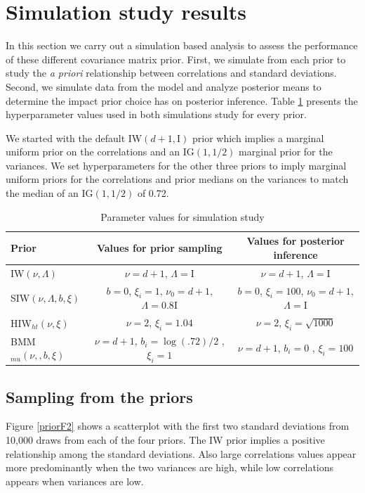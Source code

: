 \documentclass[12pt]{article}
\newcommand{\I}{\mathrm{I}}
\begin{document}
\section{Simulation study results \label{sec:results}}

In this section we carry out a simulation based analysis to assess the performance of these different covariance matrix prior. First, we simulate from each prior to study the \emph{a priori} relationship between correlations and standard deviations. Second, we simulate data from the model and analyze posterior means to determine the impact prior choice has on posterior inference. Table \ref{paramvals} presents the hyperparameter values used in both simulations study for every prior. 

We started with the default IW$(d+1,\I)$ prior which implies a marginal uniform prior on the correlations and an IG$(1,1/2)$ marginal prior for the variances. We set hyperparameters for the other three priors to imply marginal uniform priors for the correlations and prior medians on the variances to match the median of an IG$(1,1/2)$ of 0.72.    

\begin{table}[htbp]
   \centering
    \caption{ Parameter values for simulation study}
   \label{paramvals} 
   \begin{tabular}{ l|c|c}
   \hline
      Prior    &  Values for prior sampling & Values for posterior inference\\ \hline
  IW$(\nu, \Lambda)$ &   $\nu=d+1$, $\Lambda=\I$  & $\nu=d+1$, $\Lambda=\I$  \\ 
  SIW$(\nu, \Lambda, b, \xi)$  & $b=0$, $\xi_i =1$,  $\nu_0= d + 1$, $\Lambda = 0.8\I$ & $b=0$, $\xi_i =100$,  $\nu_0= d + 1$, $\Lambda = \I$ \\
  HIW$_{ht}(\nu, \xi)$    &  $\nu=2$,  $\xi_i=1.04$ & $\nu=2$,  $\xi_i= \sqrt{1000}$ \\
   BMM$_{mu}(\nu,,b,\xi)$   &  $\nu=d+1$, $b_i=\log(.72)/2$ , $\xi_i=1$ &  $\nu=d+1$, $b_i=0$ , $\xi_i=100$ \\ \hline
   \end{tabular}
 \end{table}       


\subsection{Sampling from the priors} 

Figure \ref{priorF2} shows a scatterplot with the first two standard deviations from 10,000 draws from each of the four priors. The IW prior implies a positive relationship among the standard deviations. Also large correlations values appear more predominantly when the two variances are high, while low correlations appears when variances are low. 
\end{document}
